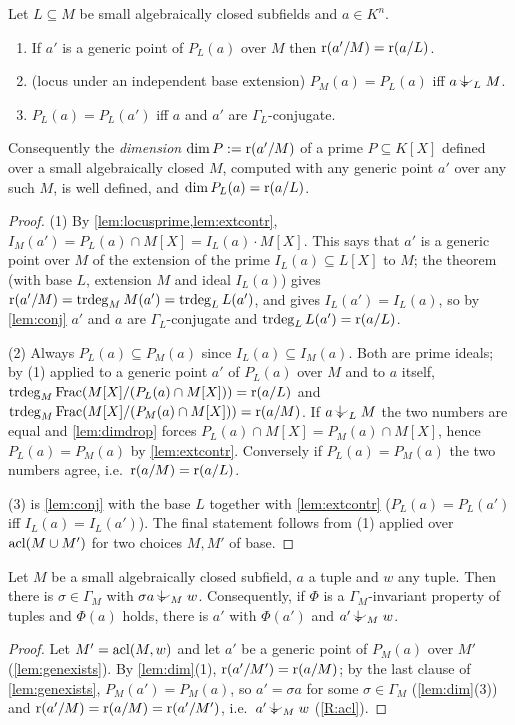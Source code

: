 \begin{lemma}\label{lem:dim}
Let $L\subseteq M$ be small algebraically closed subfields and $a\in K^n$.
\begin{enumerate}[nosep]
\item If $a'$ is a generic point of $P_L(a)$ over $M$ then $\operatorname{r}(a'/M)=\operatorname{r}(a/L)$.
\item (locus under an independent base extension) $P_M(a)=P_L(a)$ iff $a\ind{L}M$.
\item $P_L(a)=P_L(a')$ iff $a$ and $a'$ are $\Gamma_L$-conjugate.
\end{enumerate}
Consequently the \emph{dimension} $\dim P:=\operatorname{r}(a'/M)$ of a prime $P\subseteq K[X]$
defined over a small algebraically closed $M$, computed with any generic point $a'$
over any such $M$, is well defined, and $\dim P_L(a)=\operatorname{r}(a/L)$.
\end{lemma}
\begin{proof}
(1) By \cref{lem:locusprime,lem:extcontr}, $I_M(a')=P_L(a)\cap M[X]=I_L(a)\cdot M[X]$.
This says that $a'$ is a generic point over $M$ of the extension of the prime
$I_L(a)\subseteq L[X]$ to $M$; the theorem
 (with base $L$, extension $M$ and ideal
$I_L(a)$) gives $\operatorname{r}(a'/M)=\operatorname{trdeg}_M M(a')=\operatorname{trdeg}_L L(a')$, and
 gives $I_L(a')=I_L(a)$, so by \cref{lem:conj} $a'$
and $a$ are $\Gamma_L$-conjugate and $\operatorname{trdeg}_L L(a')=\operatorname{r}(a/L)$.

(2) Always $P_L(a)\subseteq P_M(a)$ since $I_L(a)\subseteq I_M(a)$.  Both are prime
ideals; by (1) applied to a generic point $a'$ of $P_L(a)$ over $M$ and to $a$ itself,
$\operatorname{trdeg}_M\operatorname{Frac}(M[X]/(P_L(a)\cap M[X]))=\operatorname{r}(a/L)$ and
$\operatorname{trdeg}_M\operatorname{Frac}(M[X]/(P_M(a)\cap M[X]))=\operatorname{r}(a/M)$.  If $a\ind{L}M$ the
two numbers are equal and \cref{lem:dimdrop} forces $P_L(a)\cap M[X]=P_M(a)\cap M[X]$,
hence $P_L(a)=P_M(a)$ by \cref{lem:extcontr}.  Conversely if $P_L(a)=P_M(a)$ the two
numbers agree, i.e.\ $\operatorname{r}(a/M)=\operatorname{r}(a/L)$.

(3) is \cref{lem:conj} with the base $L$ together with \cref{lem:extcontr}
($P_L(a)=P_L(a')$ iff $I_L(a)=I_L(a')$).  The final statement follows from (1)
applied over $\operatorname{acl}(M\cup M')$ for two choices $M,M'$ of base.
\end{proof}

\begin{lemma}\label{lem:fresh-conj}
Let $M$ be a small algebraically closed subfield, $a$ a tuple and $w$ any tuple.  Then
there is $\sigma\in\Gamma_M$ with $\sigma a\ind{M}w$.  Consequently, if $\Phi$ is a
$\Gamma_M$-invariant property of tuples and $\Phi(a)$ holds, there is $a'$ with
$\Phi(a')$ and $a'\ind{M}w$.
\end{lemma}
\begin{proof}
Let $M'=\operatorname{acl}(M,w)$ and let $a'$ be a generic point of $P_M(a)$ over $M'$
(\cref{lem:genexists}).  By \cref{lem:dim}(1), $\operatorname{r}(a'/M')=\operatorname{r}(a/M)$; by the last
clause of \cref{lem:genexists}, $P_M(a')=P_M(a)$, so $a'=\sigma a$ for some
$\sigma\in\Gamma_M$ (\cref{lem:dim}(3)) and $\operatorname{r}(a'/M)=\operatorname{r}(a/M)=\operatorname{r}(a'/M')$, i.e.\
$a'\ind{M}w$ (\ref{R:acl}).
\end{proof}

